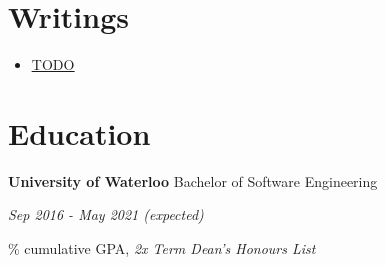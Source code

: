 \documentclass[paper=a4,fontsize=15pt]{scrartcl}
\newcommand{\quarterspace}{\vspace*{0.25em}}
\begin{document}
\section*{Writings}{}
\begin{itemize}[noitemsep,leftmargin=20pt,label=\raisebox{0.25ex}{\tiny$\bullet$},topsep=5pt]
  \small
  \item \href{http://akshaypall.me}{\ul{TODO}} 
\end{itemize}

\section*{Education}{}
\noindent \textbf{University of Waterloo} Bachelor of Software Engineering \par
\quarterspace
\footnotesize
\noindent \textit{Sep 2016 - May 2021 (expected)} \par
{}\% cumulative GPA, \textit{2x Term Dean's Honours List}
\end{document}
